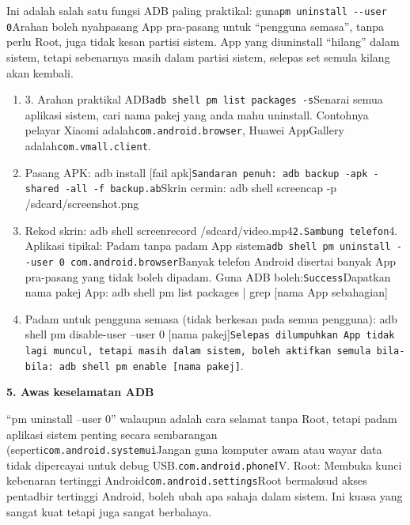 Ini adalah salah satu fungsi ADB paling praktikal: guna\texttt{pm uninstall -\allowbreak -\allowbreak user 0}Arahan boleh nyahpasang App pra-pasang untuk “pengguna semasa”, tanpa perlu Root, juga tidak kesan partisi sistem. App yang diuninstall “hilang” dalam sistem, tetapi sebenarnya masih dalam partisi sistem, selepas set semula kilang akan kembali.

\begin{enumerate}
  \item 3. Arahan praktikal ADB\texttt{adb shell pm list packages -\allowbreak s}Senarai semua aplikasi sistem, cari nama pakej yang anda mahu uninstall. Contohnya pelayar Xiaomi adalah\texttt{com.\allowbreak android.\allowbreak browser}, Huawei AppGallery adalah\texttt{com.\allowbreak vmall.\allowbreak client}.
  \item Pasang APK: adb install [fail apk]\texttt{Sandaran penuh: adb backup -\allowbreak apk -\allowbreak shared -\allowbreak all -\allowbreak f backup.\allowbreak ab}Skrin cermin: adb shell screencap -p /sdcard/screenshot.png
  \item Rekod skrin: adb shell screenrecord /sdcard/video.mp4\texttt{2.\allowbreak  Sambung telefon}4. Aplikasi tipikal: Padam tanpa padam App sistem\texttt{adb shell pm uninstall -\allowbreak -\allowbreak user 0 com.\allowbreak android.\allowbreak browser}Banyak telefon Android disertai banyak App pra-pasang yang tidak boleh dipadam. Guna ADB boleh:\texttt{Success}Dapatkan nama pakej App: adb shell pm list packages | grep [nama App sebahagian]
  \item Padam untuk pengguna semasa (tidak berkesan pada semua pengguna): adb shell pm disable-user --user 0 [nama pakej]\texttt{Selepas dilumpuhkan App tidak lagi muncul, tetapi masih dalam sistem, boleh aktifkan semula bila-\allowbreak bila: adb shell pm enable [nama pakej]}.
\end{enumerate}

\textbf{5. Awas keselamatan ADB}\par

“pm uninstall --user 0” walaupun adalah cara selamat tanpa Root, tetapi padam aplikasi sistem penting secara sembarangan (seperti\texttt{com.\allowbreak android.\allowbreak systemui}Jangan guna komputer awam atau wayar data tidak dipercayai untuk debug USB.\texttt{com.\allowbreak android.\allowbreak phone}IV. Root: Membuka kunci kebenaran tertinggi Android\texttt{com.\allowbreak android.\allowbreak settings}Root bermaksud akses pentadbir tertinggi Android, boleh ubah apa sahaja dalam sistem. Ini kuasa yang sangat kuat tetapi juga sangat berbahaya.

